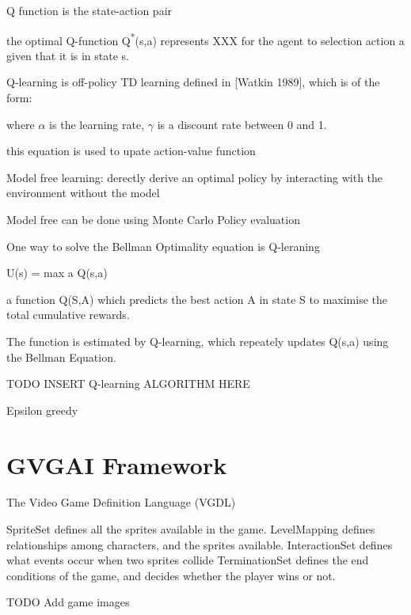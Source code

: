 \documentclass[12pt,twoside]{report}
\begin{document}
Q function is the state-action pair

the optimal Q-function Q\textsuperscript{*}(s,a) represents XXX for the agent to selection action a given that it is in state s.

Q-learning is off-policy TD learning defined in [Watkin 1989], which is of the form:
%
%

where $\alpha$ is the learning rate, $\gamma$ is a discount rate between 0 and 1.

this equation is used to upate action-value function

Model free learning: derectly derive an optimal policy by interacting with the environment without the model

Model free can be done using Monte Carlo Policy evaluation

One way to solve the Bellman Optimality equation is Q-leraning

U(s) = max a Q(s,a)


a function Q(S,A) which predicts the best action A in state S to maximise the total cumulative rewards.

The function is estimated by Q-learning, which repeately updates Q(s,a) using
the Bellman Equation.

TODO INSERT Q-learning ALGORITHM HERE

Epsilon greedy

\section{GVGAI Framework}
\label{gvgai}

The Video Game Definition Language (VGDL)

SpriteSet defines all the sprites available in the game.
LevelMapping defines relationships among characters, and the sprites available.
InteractionSet defines what events occur when two sprites collide
TerminationSet defines the end conditions of the game, and decides whether the player wins or not.

TODO Add game images


\end{document}
